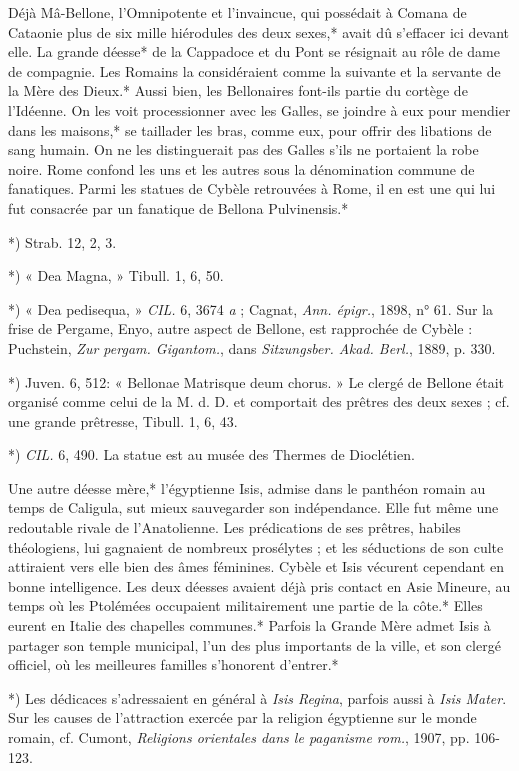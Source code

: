 \documentclass[a4paper, 11pt, oneside, polutonikogreek, french]{article}
\begin{document}
Déjà Mâ-Bellone, l'Omnipotente et l'invaincue, qui possédait à Comana de Cataonie plus de six mille hiérodules des deux sexes,* avait dû s'effacer ici devant elle. La grande déesse* de la Cappadoce et du Pont se résignait au rôle de dame de compagnie. Les Romains la considéraient comme la suivante et la servante de la Mère des Dieux.* Aussi bien, les Bellonaires font-ils partie du cortège de l'Idéenne. On les voit processionner avec les Galles, se joindre à eux pour mendier dans les maisons,* se taillader les bras, comme eux, pour offrir des libations de sang humain. On ne les distinguerait pas des Galles s'ils ne portaient la robe noire. Rome confond les uns et les autres sous la dénomination commune de fanatiques. Parmi les statues de Cybèle retrouvées à Rome, il en est une qui lui fut consacrée par un fanatique de Bellona Pulvinensis.*

*) Strab. 12, 2, 3.

*) « Dea Magna, » Tibull. 1, 6, 50.

*) « Dea pedisequa, » \emph{CIL.} 6, 3674 \emph{a} ; Cagnat, \emph{Ann. épigr.}, 1898, n° 61. Sur la frise de Pergame, Enyo, autre aspect de Bellone, est rapprochée de Cybèle : Puchstein, \emph{Zur pergam. Gigantom.}, dans \emph{Sitzungsber. Akad. Berl.}, 1889, p. 330.

*) Juven. 6, 512: « Bellonae Matrisque deum chorus. » Le clergé de Bellone était organisé comme celui de la M. d. D. et comportait des prêtres des deux sexes ; cf. une grande prêtresse, Tibull. 1, 6, 43.

*) \emph{CIL.} 6, 490. La statue est au musée des Thermes de Dioclétien.

Une autre déesse mère,* l'égyptienne Isis, admise dans le panthéon romain au temps de Caligula, sut mieux sauvegarder son indépendance. Elle fut même une redoutable rivale de l'Anatolienne. Les prédications de ses prêtres, habiles théologiens, lui gagnaient de nombreux prosélytes ; et les séductions de son culte attiraient vers elle bien des âmes féminines. Cybèle et Isis vécurent cependant en bonne intelligence. Les deux déesses avaient déjà pris contact en Asie Mineure, au temps où les Ptolémées occupaient militairement une partie de la côte.* Elles eurent en Italie des chapelles communes.* Parfois la Grande Mère admet Isis à partager son temple municipal, l'un des plus importants de la ville, et son clergé officiel, où les meilleures familles s'honorent d'entrer.*

*) Les dédicaces s'adressaient en général à \emph{Isis Regina}, parfois aussi à \emph{Isis Mater}. Sur les causes de l'attraction exercée par la religion égyptienne sur le monde romain, cf. Cumont, \emph{Religions orientales dans le paganisme rom.}, 1907, pp. 106-123.
\end{document}
